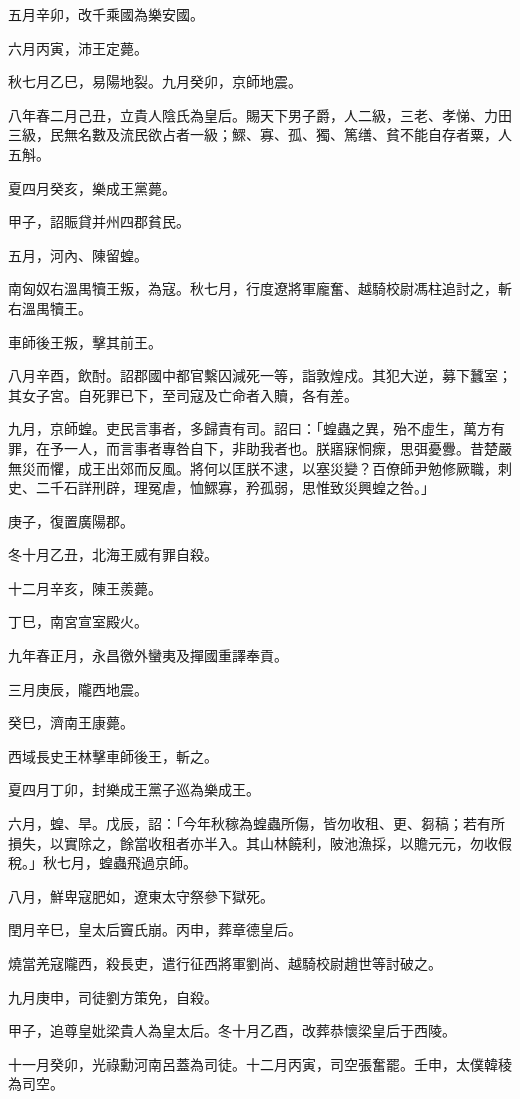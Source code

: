 \begin{pinyinscope}
五月辛卯，改千乘國為樂安國。

六月丙寅，沛王定薨。

秋七月乙巳，易陽地裂。九月癸卯，京師地震。

八年春二月己丑，立貴人陰氏為皇后。賜天下男子爵，人二級，三老、孝悌、力田三級，民無名數及流民欲占者一級；鰥、寡、孤、獨、篤缮、貧不能自存者粟，人五斛。

夏四月癸亥，樂成王黨薨。

甲子，詔賑貸并州四郡貧民。

五月，河內、陳留蝗。

南匈奴右溫禺犢王叛，為寇。秋七月，行度遼將軍龐奮、越騎校尉馮柱追討之，斬右溫禺犢王。

車師後王叛，擊其前王。

八月辛酉，飲酎。詔郡國中都官繫囚減死一等，詣敦煌戍。其犯大逆，募下蠶室；其女子宮。自死罪已下，至司寇及亡命者入贖，各有差。

九月，京師蝗。吏民言事者，多歸責有司。詔曰：「蝗蟲之異，殆不虛生，萬方有罪，在予一人，而言事者專咎自下，非助我者也。朕寤寐恫瘝，思弭憂釁。昔楚嚴無災而懼，成王出郊而反風。將何以匡朕不逮，以塞災變？百僚師尹勉修厥職，刺史、二千石詳刑辟，理冤虐，恤鰥寡，矜孤弱，思惟致災興蝗之咎。」

庚子，復置廣陽郡。

冬十月乙丑，北海王威有罪自殺。

十二月辛亥，陳王羨薨。

丁巳，南宮宣室殿火。

九年春正月，永昌徼外蠻夷及撣國重譯奉貢。

三月庚辰，隴西地震。

癸巳，濟南王康薨。

西域長史王林擊車師後王，斬之。

夏四月丁卯，封樂成王黨子巡為樂成王。

六月，蝗、旱。戊辰，詔：「今年秋稼為蝗蟲所傷，皆勿收租、更、芻稿；若有所損失，以實除之，餘當收租者亦半入。其山林饒利，陂池漁採，以贍元元，勿收假稅。」秋七月，蝗蟲飛過京師。

八月，鮮卑寇肥如，遼東太守祭參下獄死。

閏月辛巳，皇太后竇氏崩。丙申，葬章德皇后。

燒當羌寇隴西，殺長吏，遣行征西將軍劉尚、越騎校尉趙世等討破之。

九月庚申，司徒劉方策免，自殺。

甲子，追尊皇妣梁貴人為皇太后。冬十月乙酉，改葬恭懷梁皇后于西陵。

十一月癸卯，光祿勳河南呂蓋為司徒。十二月丙寅，司空張奮罷。壬申，太僕韓稜為司空。


\end{pinyinscope}
